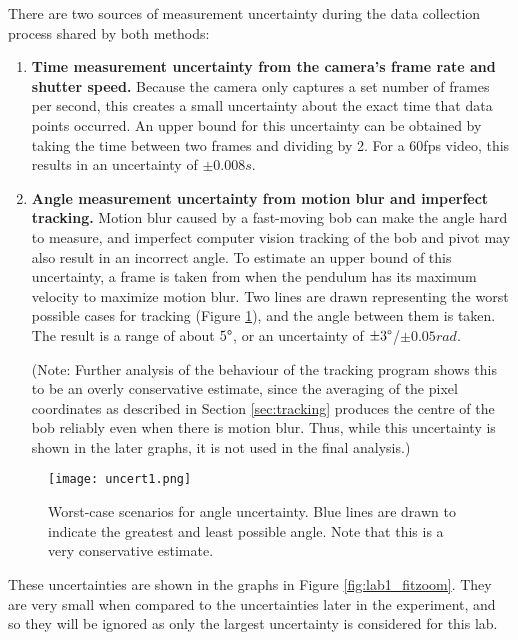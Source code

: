 \documentclass[aps,twocolumn,secnumarabic,nobalancelastpage,amsmath,amssymb,nofootinbib,floatfix,letterpaper]{revtex4}
\begin{document}
There are two sources of measurement uncertainty during the data collection process shared by both methods:
\begin{enumerate}
    \item 
        \textbf{Time measurement uncertainty from the camera's frame rate and shutter speed.} Because the camera only
        captures a set number of frames per second, this creates a small uncertainty about the exact time that data
        points occurred. An upper bound for this uncertainty can be obtained by taking the time between two frames and
        dividing by 2. For a 60fps video, this results in an uncertainty of \(\pm 0.008\si{s}\).
    \item
        \textbf{Angle measurement uncertainty from motion blur and imperfect tracking.} Motion blur caused by a
        fast-moving bob can make the angle hard to measure, and imperfect computer vision tracking of the bob and
        pivot may also result in an incorrect angle. To estimate an upper bound of this uncertainty, a frame is taken
        from when the pendulum has its maximum velocity to maximize motion blur. Two lines are drawn representing the
        worst possible cases for tracking (Figure \ref{fig:angle_uncert}), and the angle between them is taken. The
        result is a range of about \(5\degree\), or an uncertainty of \(\pm 3\degree\)/\(\pm 0.05\si{rad}\).
        
        (Note: Further analysis of the behaviour of the tracking program shows this to be an overly conservative
        estimate, since the averaging of the pixel coordinates as described in Section \ref{sec:tracking} produces the
        centre of the bob reliably even when there is motion blur. Thus, while this uncertainty is shown in the later
        graphs, it is not used in the final analysis.)
\end{enumerate}
\begin{figure}[htb]
    \texttt{[image: uncert1.png]}
    \caption{Worst-case scenarios for angle uncertainty. Blue lines are drawn to indicate the greatest and least
        possible angle. Note that this is a very conservative estimate.}
    \label{fig:angle_uncert}
\end{figure}

These uncertainties are shown in the graphs in Figure \ref{fig:lab1_fitzoom}. They are very small when
compared to the uncertainties later in the experiment, and so they will be ignored as only the largest uncertainty is
considered for this lab.
\end{document}
